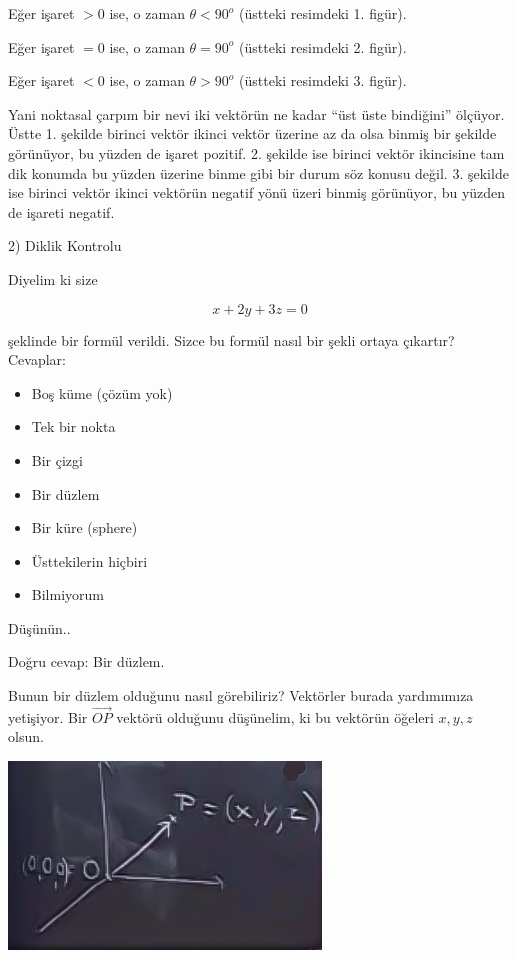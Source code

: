 \documentclass[12pt,fleqn]{article}\usepackage{../../common}
\begin{document}
Eğer işaret $>0$ ise, o zaman $\theta < 90^o$ (üstteki resimdeki
1. figür). 

Eğer işaret $=0$ ise, o zaman $\theta = 90^o$ (üstteki resimdeki
2. figür). 

Eğer işaret $<0$ ise, o zaman $\theta > 90^o$ (üstteki resimdeki
3. figür). 

Yani noktasal çarpım bir nevi iki vektörün ne kadar ``üst üste bindiğini''
ölçüyor. Üstte 1. şekilde birinci vektör ikinci vektör üzerine az da olsa binmiş 
bir şekilde görünüyor, bu yüzden de işaret pozitif. 2. şekilde ise birinci 
vektör ikincisine tam dik konumda bu yüzden üzerine binme gibi bir durum söz 
konusu değil. 3. şekilde ise birinci vektör ikinci vektörün negatif yönü üzeri 
binmiş görünüyor, bu yüzden de işareti negatif. 

2) Diklik Kontrolu

Diyelim ki size 

$$ x + 2y + 3z = 0 $$

şeklinde bir formül verildi. Sizce bu formül nasıl bir şekli ortaya çıkartır?
Cevaplar:

\begin{itemize}
   \item Boş küme (çözüm yok)
   \item Tek bir nokta
   \item Bir çizgi
   \item Bir düzlem
   \item Bir küre (sphere)
   \item Üsttekilerin hiçbiri
   \item Bilmiyorum
\end{itemize}

Düşünün.. 

Doğru cevap:  Bir düzlem. 

Bunun bir düzlem olduğunu nasıl görebiliriz? Vektörler burada yardımımıza
yetişiyor. Bir $\vec{OP}$ vektörü olduğunu düşünelim, ki bu vektörün öğeleri
$x,y,z$ olsun.

\begin{center}
\includegraphics[height=5cm]{1_14.png}
\end{center}
\end{document}
